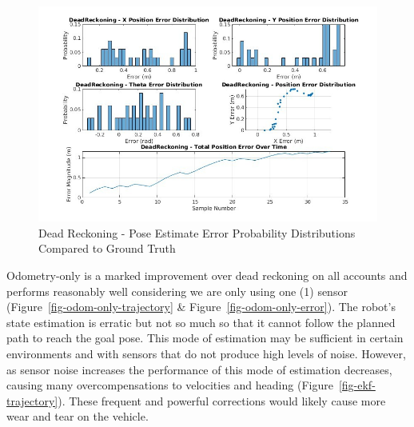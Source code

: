 \documentclass[
  letterpaper,
  DIV=11,
  numbers=noendperiod]{scrartcl}
\begin{document}
\begin{figure}

{\centering \includegraphics{dead-reckoning-error.png}

}

\caption{\label{fig-dead-reckoning-error}Dead Reckoning - Pose Estimate
Error Probability Distributions Compared to Ground Truth}

\end{figure}

Odometry-only is a marked improvement over dead reckoning on all
accounts and performs reasonably well considering we are only using one
(1) sensor (Figure~\ref{fig-odom-only-trajectory} \&
Figure~\ref{fig-odom-only-error}). The robot's state estimation is
erratic but not so much so that it cannot follow the planned path to
reach the goal pose. This mode of estimation may be sufficient in
certain environments and with sensors that do not produce high levels of
noise. However, as sensor noise increases the performance of this mode
of estimation decreases, causing many overcompensations to velocities
and heading (Figure~\ref{fig-ekf-trajectory}). These frequent and
powerful corrections would likely cause more wear and tear on the
vehicle.
\end{document}
